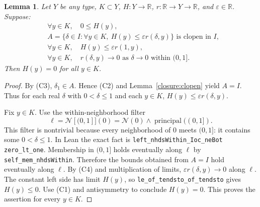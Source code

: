 \documentclass[11pt]{article}
\newtheorem{lemma}[theorem]{Lemma}
\theoremstyle{definition}
\theoremstyle{remark}
\newcommand{\R}{\mathbb R}
\numberwithin{equation}{section}
\providecommand{\I}{I}
\providecommand{\nhds}{\mathcal N}
\begin{document}
\begin{lemma}\label{closure:pointwise-clopen}
Let $Y$ be any type, $K\subset Y$, $H:Y\to\R$,
$r:\R\to Y\to\R$, and $\varepsilon\in\R$.  Suppose:
\begin{align*}
 &\forall y\in K,\quad 0\leq H(y),\tag{C1}\\
 &A=\{\delta\in\I:\forall y\in K,\ H(y)\leq\varepsilon r(\delta,y)\}
     \text{ is clopen in }\I,\tag{C2}\\
 &\forall y\in K,\quad H(y)\leq\varepsilon r(1,y),\tag{C3}\\
 &\forall y\in K,\quad r(\delta,y)\longrightarrow0
   \text{ as }\delta\to0\text{ within }(0,1].\tag{C4}
\end{align*}
Then $H(y)=0$ for all $y\in K$.
\end{lemma}
\begin{proof}
By (C3), $\delta_1\in A$.  Hence (C2) and
Lemma~\ref{closure:clopen} yield $A=\I$.  Thus for each real $\delta$
with $0<\delta\leq1$ and each $y\in K$,
$H(y)\leq\varepsilon r(\delta,y)$.

Fix $y\in K$.  Use the within-neighborhood filter
\[
 \ell=\nhds[(0,1]](0)=\nhds(0)\wedge\operatorname{principal}((0,1]).
\]
This filter is nontrivial because every neighborhood of $0$ meets
$(0,1]$: it contains some $0<\delta\leq1$.  In Lean the exact
fact is \texttt{left\_nhdsWithin\_Ioc\_neBot zero\_lt\_one}.
Membership in $(0,1]$ holds eventually along $\ell$ by
\texttt{self\_mem\_nhdsWithin}.  Therefore the bounds obtained from
$A=\I$ hold eventually along $\ell$.  By (C4) and multiplication of
limits, $\varepsilon r(\delta,y)\to0$ along $\ell$.
The constant left side has limit $H(y)$, so
\texttt{le\_of\_tendsto\_of\_tendsto} gives $H(y)\leq0$.
Use (C1) and antisymmetry to conclude $H(y)=0$.
This proves the assertion for every $y\in K$.
\end{proof}
\end{document}
